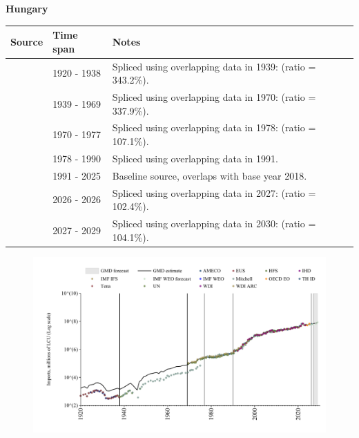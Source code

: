 \documentclass[12pt,a4paper,landscape]{article}
\begin{document}
\begin{adjustbox}{max totalsize={\paperwidth}{\paperheight},center}
\begin{minipage}[t][\textheight][t]{\textwidth}
\vspace*{0.5cm}
{}
\begin{center}
{\Large\bfseries Hungary}
\end{center}
\vspace{0.5cm}
\begin{table}[H]
\centering
\small
\begin{tabular}{|l|l|l|}
\hline
\textbf{Source} & \textbf{Time span} & \textbf{Notes} \\
\hline
\rowcolor{white}\cite{Tena}& 1920 - 1938 &Spliced using overlapping data in 1939: (ratio = 343.2\%).\\
\rowcolor{lightgray}\cite{Mitchell}& 1939 - 1969 &Spliced using overlapping data in 1970: (ratio = 337.9\%).\\
\rowcolor{white}\cite{UN}& 1970 - 1977 &Spliced using overlapping data in 1978: (ratio = 107.1\%).\\
\rowcolor{lightgray}\cite{AMECO}& 1978 - 1990 &Spliced using overlapping data in 1991.\\
\rowcolor{white}\cite{OECD_EO}& 1991 - 2025 &Baseline source, overlaps with base year 2018.\\
\rowcolor{lightgray}\cite{AMECO}& 2026 - 2026 &Spliced using overlapping data in 2027: (ratio = 102.4\%).\\
\rowcolor{white}\cite{IMF_WEO_forecast}& 2027 - 2029 &Spliced using overlapping data in 2030: (ratio = 104.1\%).\\
\hline
\end{tabular}
\end{table}
\begin{figure}[H]
\centering
\includegraphics[width=\textwidth,height=0.6\textheight,keepaspectratio]{graphs/HUN_imports.pdf}
\end{figure}
\end{minipage}
\end{adjustbox}
\end{document}

